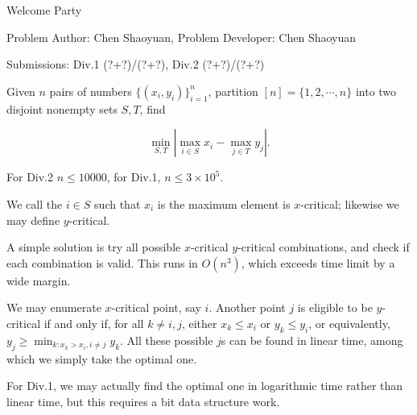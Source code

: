 \begin{Solution}{Welcome Party}

\begin{frame}{\ProblemName}

\small Problem Author: Chen Shaoyuan, Problem Developer: Chen Shaoyuan \par \vspace{0.3cm}

\small Submissions: Div.1 (?+?)/(?+?), Div.2 (?+?)/(?+?)  \par \vspace{0.5cm}

Given $n$ pairs of numbers $\{(x_i, y_i)\}_{i=1}^n$, partition $[n] = \{1, 2, \cdots, n\}$ into two disjoint nonempty sets $S, T$, find

$$ \min_{S, T} | \max_{i \in S} x_i - \max_{j \in T} y_j | . $$

For Div.2 $n \leq 10000$, for Div.1, $n \leq 3 \times 10^5$.

\pause

We call the $i \in S$ such that $x_i$ is the maximum element is $x$-critical; likewise we may define $y$-critical.

\pause

A simple solution is try all possible $x$-critical $y$-critical combinations, and check if each combination is valid. This runs in $O(n^3)$, which exceeds time limit by a wide margin.

\end{frame}

\begin{frame}{\ProblemName}

We may enumerate $x$-critical point, say $i$. Another point $j$ is eligible to be $y$-critical if and only if, for all $k \neq i, j$, either $x_k \leq x_i$ or $y_k \leq y_i$, or equivalently, $y_j \geq \min_{k : x_k > x_i, i \neq j}{y_k}$. All these possible $j$s can be found in linear time, among which we simply take the optimal one.

For Div.1, we may actually find the optimal one in logarithmic time rather than linear time, but this requires a bit data structure work.

\end{frame}

\end{Solution}
